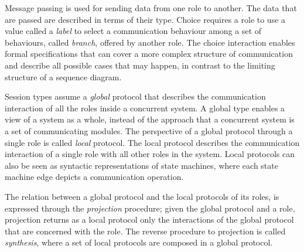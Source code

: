 Message passing is used for sending data from one role to another.
The data that are passed are described in terms of their type.
Choice requires a role to use a value called a {\em label}
to select a communication behaviour among
a set of behaviours, called {\em branch}, offered by another role.
The choice interaction enables formal specifications that can
cover a more complex structure of communication and describe all possible
cases that may happen, in contrast to the limiting structure of
a sequence diagram.

Session types assume a {\em global} protocol that describes the
communication interaction of all the roles inside a concurrent system.
A global type enables a view of a system as a whole, instead of the
approach that a concurrent system is a set of communicating modules.
The perspective of a global protocol through a single role
is called {\em local} protocol. The local protocol describes
the communication interaction of a single role with all other roles
in the system. Local protocols can also be seen as syntactic
representations of state machines, where each state machine edge
depicts a communication operation.

The relation between a global protocol and the
local protocols of its roles, is expressed
through the {\em projection} procedure;
given the global protocol and a role, projection
returns as a local protocol only the
interactions of the global protocol that are concerned with
the role.
%
The reverse procedure to projection is called {\em synthesis},
where a set of local protocols are composed %
in a global protocol.


